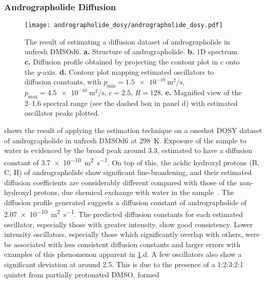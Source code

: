 \subsubsection{Andrographolide Diffusion}
\begin{figure}
    \centering
    \texttt{[image: andrographolide\_dosy/andrographolide\_dosy.pdf]}
    \caption[
        The result of estimating a diffusion dataset of andrographolide.
    ]{
        The result of estimating a diffusion dataset of andrographolide in
        unfresh \acs{DMSOd6}.
        \textbf{a.} Structure of andrographolide.
        \textbf{b.} \ac{1D} spectrum.
        \textbf{c.} Diffusion profile obtained by projecting the contour plot in
        c onto the $y$-axis.
        \textbf{d.} Contour plot mapping estimated oscillators to diffusion constants, with
        $p_{\text{min}} = \qty{1.5e-10}{\meter\squared\per\second}$,
        $p_{\text{max}} = \qty{4.5e-10}{\meter\squared\per\second}$,
        $c = 2.5$,
        $R=128$.
        \textbf{e.} Magnified view of the \SIrange{2}{1.6}{\partspermillion}
        spectral range (see the dashed box in panel d) with estimated
        oscillator peaks plotted.
    }
    \label{fig:andrographolide-dosy}
\end{figure}
 shows the result of applying the
estimation technique on a oneshot \ac{DOSY} dataset of andrographolide in
unfresh \acs{DMSOd6} at \qty{298}{\kelvin}. Exposure of the sample to water is
evidenced by the broad
peak around \qty{3.3}{\partspermillion}, estimated to have a diffusion constant
of \qty{3.7e-10}{\meter\squared\per\second}. On top of this, the acidic
hydroxyl protons (B, C, H) of andrographolide show significant line-broadening,
and their estimated diffusion coefficients are considerably different compared
with those of the non-hydroxyl protons, due chemical exchange with water in the
sample~\cite{Chen1998}.
The diffusion profile generated suggests a diffusion constant of andrographolide of
\qty{2.07e-10}{\meter\squared\per\second}. The predicted diffusion constants for
each estimated oscillator, especially those with greater intensity, show
good consistency.
Lower intensity oscillators, especially those which
significantly overlap with others, were be associated with
less consistent diffusion constants and larger errors with examples of this
phenomenon apparent in \cref{fig:andrographolide-dosy}.d. A few
oscillators also show a
significant deviation at around \qty{2.5}{\partspermillion}. This is due to the
presence of a 1:2:3:2:1 quintet from partially protonated \acs{DMSO}, formed
